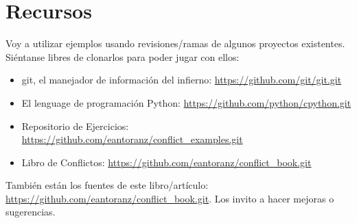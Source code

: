 
\section{Recursos}

Voy a utilizar ejemplos usando revisiones/ramas de algunos proyectos existentes. Siéntanse libres de clonarlos
para poder jugar con ellos:

\begin{itemize}

	\item git, el manejador de información del infierno: \url{https://github.com/git/git.git}
	\label{git_repo}

	\item El lenguage de programación Python: \url{https://github.com/python/cpython.git}
	\label{python_repo}
	
	\item Repositorio de Ejercicios: \url{https://github.com/eantoranz/conflict_examples.git}
	\label{exercises_repo}

	\item Libro de Conflictos: \url{https://github.com/eantoranz/conflict_book.git}
	\label{book_repo}
	
\end{itemize}

También están los fuentes de este libro/artículo: \url{https://github.com/eantoranz/conflict_book.git}.
Los invito a hacer mejoras o sugerencias.
